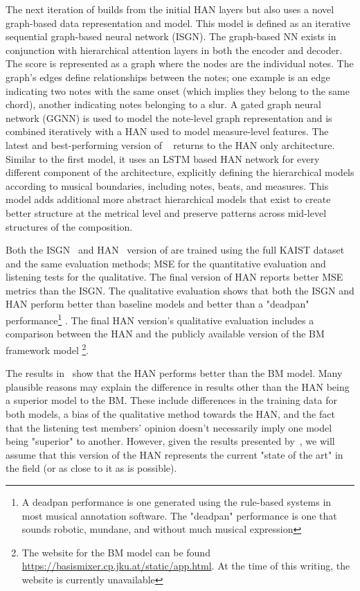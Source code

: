 The next iteration of \vnet{} builds from the initial HAN layers but also uses a novel graph-based data representation and model. This model is defined as an iterative sequential graph-based neural network (ISGN). The graph-based NN exists in conjunction with hierarchical attention layers in both the encoder and decoder. The score is represented as a graph where the nodes are the individual notes. The graph's edges define relationships between the notes; one example is an edge indicating two notes with the same onset (which implies they belong to the same chord), another indicating notes belonging to a slur. A gated graph neural network (GGNN) is used to model the note-level graph representation and is combined iteratively with a HAN used to model measure-level features. The latest and best-performing version of \vnet{}~\cite{jeong2019virtuosonet} returns to the HAN only architecture. Similar to the first \vnet{} model, it uses an LSTM based HAN network for every different component of the architecture, explicitly defining the hierarchical models according to musical boundaries, including notes, beats, and measures. This model adds additional more abstract hierarchical models that exist to create better structure at the metrical level and preserve patterns across mid-level structures of the composition.

Both the ISGN~\cite{jeong2019graph} and HAN~\cite{jeong2019virtuosonet} version of \vnet{} are trained using the full KAIST dataset and the same evaluation methods; MSE for the quantitative evaluation and listening tests for the qualitative. The final version of HAN reports better MSE metrics than the ISGN. The qualitative evaluation shows that both the ISGN and HAN perform better than baseline models and better than a "deadpan" performance\footnote{A deadpan performance is one generated using the rule-based systems in most musical annotation software. The "deadpan" performance is one that sounds robotic, mundane, and without much musical expression} . The final HAN version's qualitative evaluation includes a comparison between the HAN and the publicly available version of the BM framework model \footnote{The website for the BM model can be found \href{here}{https://basismixer.cp.jku.at/static/app.html}. At the time of this writing, the website is currently unavailable}. 

The results in~\cite{jeong2019virtuosonet} show that the HAN performs better than the BM model. Many plausible reasons may explain the difference in results other than the HAN being a superior model to the BM. These include differences in the training data for both models, a bias of the qualitative method towards the HAN, and the fact that the listening test members' opinion doesn't necessarily imply one model being "superior" to another. However, given the results presented by~\citet{jeong2019virtuosonet}, we will assume that this version of the HAN represents the current "state of the art" in the field (or as close to it as is possible). 


